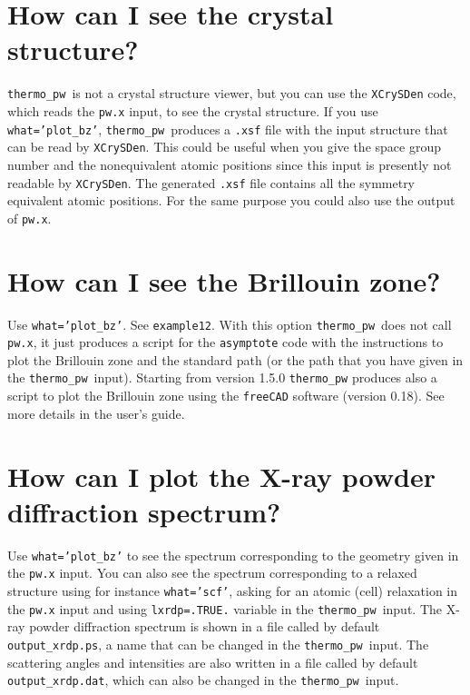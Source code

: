 \documentclass[12pt,a4paper]{article}
\def\thermo{\texttt{thermo\_pw}}
\begin{document}
\section{\color{coral}How can I see the crystal structure?}
\thermo\ is not a crystal structure viewer, but you can use the
\texttt{XCrySDen} code, which reads the \texttt{pw.x} input, to
see the crystal structure. If you use \texttt{what='plot\_bz'}, 
\thermo\ produces a \texttt{.xsf} file with the input structure 
that can be read by \texttt{XCrySDen}. This could
be useful when you give the space group number and the nonequivalent
atomic positions since this input is presently not readable by 
\texttt{XCrySDen}.
The generated \texttt{.xsf} file contains all the symmetry equivalent 
atomic positions. For the same purpose you could also use the output
of \texttt{pw.x}.

\newpage

\section{\color{coral}How can I see the Brillouin zone?}
Use \texttt{what='plot\_bz'}. See \texttt{example12}. With this option
\thermo\ does not call \texttt{pw.x}, it just produces a script for
the \texttt{asymptote} code with the instructions to plot the Brillouin
zone and the standard path (or the path that you have given in the \thermo\ 
input). Starting from version 1.5.0 \texttt{thermo\_pw} produces also a
script to plot the Brillouin zone using the \texttt{freeCAD} software
(version 0.18). See more details in the user's guide.


\newpage

\section{\color{coral}How can I plot the X-ray powder diffraction spectrum?}
Use \texttt{what='plot\_bz'} to see the spectrum corresponding to
the geometry given in the \texttt{pw.x} input. You can also see the
spectrum corresponding to a relaxed structure using for instance
\texttt{what='scf'}, asking for an atomic (cell) relaxation in the \texttt{pw.x}
input and using \texttt{lxrdp=.TRUE.} variable in the \thermo\ input.
The X-ray powder diffraction spectrum is shown in a file called by default
\texttt{output\_xrdp.ps}, a name that can be changed
in the \thermo\ input. The scattering angles and intensities
are also written in a file called by default \texttt{output\_xrdp.dat}, 
which can also be changed in the \thermo\ input.
\end{document}
